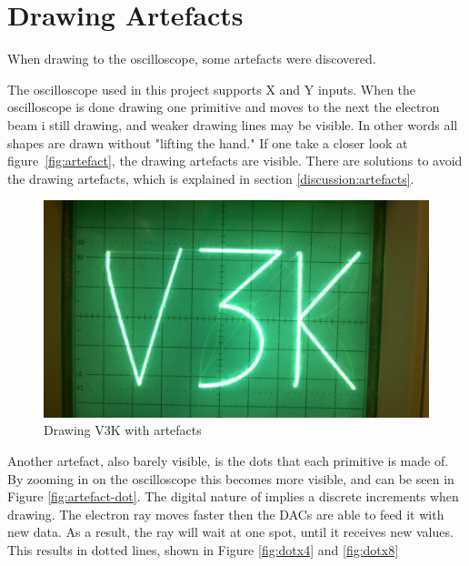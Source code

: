 \section{Drawing Artefacts}
\label{results:artefacts}
When drawing to the oscilloscope, some artefacts were discovered.

The oscilloscope used in this project supports X and Y inputs.
When the oscilloscope is done drawing one primitive and moves to the next the electron beam i still drawing,
and weaker drawing lines may be visible.
In other words all shapes are drawn without "lifting the hand."
If one take a closer look at figure~\ref{fig:artefact}, the drawing artefacts are visible.
There are solutions to avoid the drawing artefacts, which is explained in section \ref{discussion:artefacts}.

\begin{figure}[h!]
	    \includegraphics[width=\linewidth]{images/artefacts.jpg}
	    \caption{Drawing V3K with artefacts}
	    \label{fig:artifact}
\end{figure}

Another artefact, also barely visible, is the dots that each primitive is made of.
By zooming in on the oscilloscope this becomes more visible, and can be seen in Figure \ref{fig:artefact-dot}.
The digital nature of \vthreek implies a discrete increments when drawing.
The electron ray moves faster then the DACs are able to feed it with new data.
As a result, the ray will wait at one spot, until it receives new values.
This results in dotted lines, shown in Figure \ref{fig:dotx4} and \ref{fig:dotx8}

